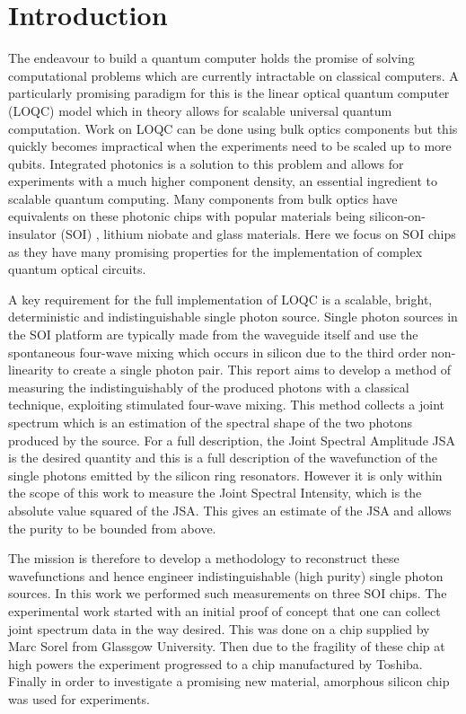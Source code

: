 \newpage
\section{Introduction}
The endeavour to build a quantum computer holds the promise of solving computational problems which are currently intractable on classical computers. A particularly promising paradigm for this is the linear optical quantum computer (LOQC) model which in theory allows for scalable universal quantum computation. Work on LOQC can be done using bulk optics components but this quickly becomes impractical when the experiments need to be scaled up to more qubits. Integrated photonics is a solution to this problem and allows for experiments with a much higher component density, an essential ingredient to scalable quantum computing. Many components from bulk optics have equivalents on these photonic chips with popular materials being silicon-on-insulator (SOI) , lithium niobate and glass materials. Here we focus on SOI chips as they have many promising properties for the implementation of complex quantum optical circuits.

A key requirement for the full implementation of LOQC is a scalable, bright, deterministic and indistinguishable single photon source. Single photon sources in the SOI platform are typically made from the waveguide itself and use the spontaneous four-wave mixing which occurs in silicon due to the third order non-linearity to create a single photon pair. This report aims to develop a method of measuring the indistinguishably of the produced photons with a classical technique, exploiting stimulated four-wave mixing. This method collects a joint spectrum which is an estimation of the spectral shape of the two photons produced by the source. For a full description, the Joint Spectral Amplitude JSA is the desired quantity and this is a full description of the wavefunction of the single photons emitted by the silicon ring resonators. However it is only within the scope of this work to measure the Joint Spectral Intensity, which is the absolute value squared of the JSA. This gives an estimate of the JSA and allows the purity to be bounded from above.

The mission is therefore to develop a methodology to reconstruct these wavefunctions and hence engineer indistinguishable (high purity) single photon sources. In this work we performed such measurements on three SOI chips. The experimental work started with an initial proof of concept that one can collect joint spectrum data in the way desired. This was done on a chip supplied by Marc Sorel from Glassgow University. Then due to the fragility of these chip at high powers the experiment progressed to a chip manufactured by Toshiba. Finally in order to investigate a promising new material, amorphous silicon chip was used for experiments. 

